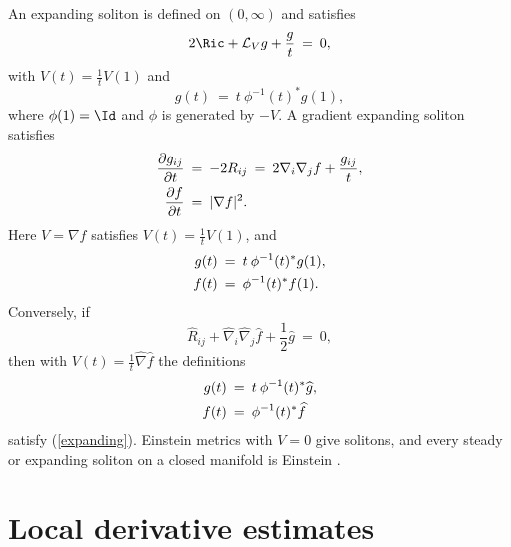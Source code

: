 An expanding soliton is defined on $(0,\infty)$ and satisfies
\begin{equation}
2\Ric+{\mathcal L}_Vg+\frac gt\:=\:0,
\end{equation}
with $V(t)=\frac1tV(1)$ and
\begin{equation}
g(t)\:=\:t\:\phi^{-1}(t)^*g(1),
\end{equation}
where $\phi(1)=\Id$ and $\phi$ is generated by $-V$.
A gradient expanding soliton satisfies
\begin{align} \label{expanding}
\frac{\partial g_{ij}}{\partial t}\: & = \:-2R_{ij}\:=\:
2\nabla_i\nabla_jf+\frac{g_{ij}}t,\\
\frac{\partial f}{\partial t}\: & = \:|\nabla f|^2. \notag
\end{align}
Here $V=\nabla f$ satisfies $V(t)=\frac1tV(1)$, and
\begin{align} \label{expandingsoln}
g(t)\: & = \:t\:\phi^{-1}(t)^*g(1),\\
f(t)\: & = \:\phi^{-1}(t)^*f(1). \notag
\end{align}
Conversely, if
\begin{equation}
\widehat R_{ij}+\widehat\nabla_i\widehat\nabla_j\widehat f
+\frac12\widehat g\:=\:0,
\end{equation}
then with $V(t)=\frac1t\widehat\nabla\widehat f$ the definitions
\begin{align}
g(t)\: & = \:t\:\phi^{-1}(t)^*\widehat g,\\
f(t)\: & = \:\phi^{-1}(t)^*\widehat f \notag
\end{align}
satisfy (\ref{expanding}). Einstein metrics with $V=0$ give solitons, and
every steady or expanding soliton on a closed manifold is Einstein
\cite[Chapter 2]{Chow-Knopf}.

\section{Local derivative estimates} \label{applocalder}

